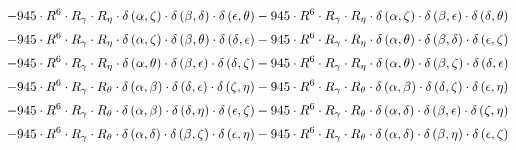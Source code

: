 \begin{subequations}
\begin{gather}
 \\[0.2em] \notag 		 - 945 \cdot R^{6} \cdot R_{\gamma{}} \cdot R_{\eta{}} \cdot \delta{}\left(\alpha{}, \zeta{}\right) \cdot \delta{}\left(\beta{}, \delta{}\right) \cdot \delta{}\left(\epsilon{}, \theta{}\right)- 945 \cdot R^{6} \cdot R_{\gamma{}} \cdot R_{\eta{}} \cdot \delta{}\left(\alpha{}, \zeta{}\right) \cdot \delta{}\left(\beta{}, \epsilon{}\right) \cdot \delta{}\left(\delta{}, \theta{}\right) 
 \\[0.2em] \notag 		 - 945 \cdot R^{6} \cdot R_{\gamma{}} \cdot R_{\eta{}} \cdot \delta{}\left(\alpha{}, \zeta{}\right) \cdot \delta{}\left(\beta{}, \theta{}\right) \cdot \delta{}\left(\delta{}, \epsilon{}\right)- 945 \cdot R^{6} \cdot R_{\gamma{}} \cdot R_{\eta{}} \cdot \delta{}\left(\alpha{}, \theta{}\right) \cdot \delta{}\left(\beta{}, \delta{}\right) \cdot \delta{}\left(\epsilon{}, \zeta{}\right) 
 \\[0.2em] \notag 		 - 945 \cdot R^{6} \cdot R_{\gamma{}} \cdot R_{\eta{}} \cdot \delta{}\left(\alpha{}, \theta{}\right) \cdot \delta{}\left(\beta{}, \epsilon{}\right) \cdot \delta{}\left(\delta{}, \zeta{}\right)- 945 \cdot R^{6} \cdot R_{\gamma{}} \cdot R_{\eta{}} \cdot \delta{}\left(\alpha{}, \theta{}\right) \cdot \delta{}\left(\beta{}, \zeta{}\right) \cdot \delta{}\left(\delta{}, \epsilon{}\right) 
 \\[0.2em] \notag 		 - 945 \cdot R^{6} \cdot R_{\gamma{}} \cdot R_{\theta{}} \cdot \delta{}\left(\alpha{}, \beta{}\right) \cdot \delta{}\left(\delta{}, \epsilon{}\right) \cdot \delta{}\left(\zeta{}, \eta{}\right)- 945 \cdot R^{6} \cdot R_{\gamma{}} \cdot R_{\theta{}} \cdot \delta{}\left(\alpha{}, \beta{}\right) \cdot \delta{}\left(\delta{}, \zeta{}\right) \cdot \delta{}\left(\epsilon{}, \eta{}\right) 
 \\[0.2em] \notag 		 - 945 \cdot R^{6} \cdot R_{\gamma{}} \cdot R_{\theta{}} \cdot \delta{}\left(\alpha{}, \beta{}\right) \cdot \delta{}\left(\delta{}, \eta{}\right) \cdot \delta{}\left(\epsilon{}, \zeta{}\right)- 945 \cdot R^{6} \cdot R_{\gamma{}} \cdot R_{\theta{}} \cdot \delta{}\left(\alpha{}, \delta{}\right) \cdot \delta{}\left(\beta{}, \epsilon{}\right) \cdot \delta{}\left(\zeta{}, \eta{}\right) 
 \\[0.2em] \notag 		 - 945 \cdot R^{6} \cdot R_{\gamma{}} \cdot R_{\theta{}} \cdot \delta{}\left(\alpha{}, \delta{}\right) \cdot \delta{}\left(\beta{}, \zeta{}\right) \cdot \delta{}\left(\epsilon{}, \eta{}\right)- 945 \cdot R^{6} \cdot R_{\gamma{}} \cdot R_{\theta{}} \cdot \delta{}\left(\alpha{}, \delta{}\right) \cdot \delta{}\left(\beta{}, \eta{}\right) \cdot \delta{}\left(\epsilon{}, \zeta{}\right) 

\end{gather}
\end{subequations}

